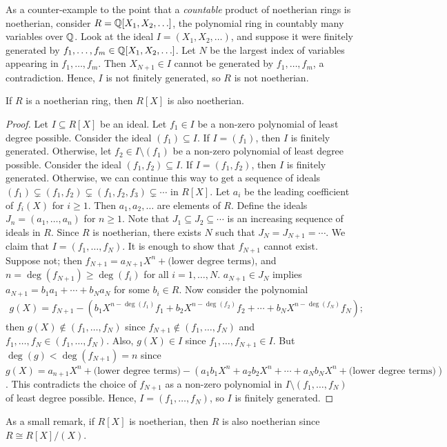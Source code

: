 \begin{example}
    As a counter-example to the point that a \textit{countable} product of noetherian rings is noetherian, consider $R = \mathbb{Q}[X_{1},X_{2},\ldots]$, the polynomial ring in countably many variables over $\mathbb{Q}$. Look at the ideal $I = (X_{1},X_{2},\ldots)$, and suppose it were finitely generated by $f_{1},\ldots,f_{m} \in \mathbb{Q}[X_{1},X_{2},\ldots]$. Let $N$ be the largest index of variables appearing in $f_{1},\ldots,f_{m}$. Then $X_{N+1} \in I$ cannot be generated by $f_{1},\ldots,f_{m}$, a contradiction. Hence, $I$ is not finitely generated, so $R$ is not noetherian.
\end{example}

\begin{theorem}
    If $R$ is a noetherian ring, then $R[X]$ is also noetherian.
\end{theorem}
\begin{proof}
    Let $I \subseteq R[X]$ be an ideal. Let $f_{1} \in I$ be a non-zero polynomial of least degree possible. Consider the ideal $(f_{1}) \subseteq I$. If $I = (f_{1})$, then $I$ is finitely generated. Otherwise, let $f_{2} \in I \setminus (f_{1})$ be a non-zero polynomial of least degree possible. Consider the ideal $(f_{1},f_{2}) \subseteq I$. If $I = (f_{1},f_{2})$, then $I$ is finitely generated. Otherwise, we can continue this way to get a sequence of ideals $(f_{1}) \subsetneq (f_{1},f_{2}) \subsetneq (f_{1},f_{2},f_{3}) \subsetneq \cdots$ in $R[X]$. Let $a_{i}$ be the leading coefficient of $f_{i}(X)$ for $i \geq 1$. Then $a_{1},a_{2},\ldots$ are elements of $R$. Define the ideals $J_{n} = (a_{1},\ldots,a_{n})$ for $n \geq 1$. Note that $J_{1} \subseteq J_{2} \subseteq \cdots$ is an increasing sequence of ideals in $R$. Since $R$ is noetherian, there exists $N$ such that $J_{N} = J_{N+1} = \cdots$. We claim that $I = (f_{1},\ldots,f_{N})$. It is enough to show that $f_{N+1}$ cannot exist. Suppose not; then $f_{N+1} = a_{N+1} X^{n} + \text{(lower degree terms)}$, and $n = \deg(f_{N+1}) \geq \deg(f_{i})$ for all $i = 1,\ldots,N$. $a_{N+1} \in J_{N}$ implies $a_{N+1} = b_{1}a_{1} + \cdots + b_{N} a_{N}$ for some $b_{i} \in R$. Now consider the polynomial
    \begin{align}
        g(X) = f_{N+1} - \left( b_{1} X^{n-\deg(f_{1})}f_{1} + b_{2} X^{n-\deg(f_{2})}f_{2} + \cdots + b_{N} X^{n-\deg(f_{N})}f_{N} \right);
    \end{align}
    then $g(X) \notin (f_{1},\ldots,f_{N})$ since $f_{N+1} \notin (f_{1},\ldots,f_{N})$ and $f_{1},\ldots,f_{N} \in (f_{1},\ldots,f_{N})$. Also, $g(X) \in I$ since $f_{1},\ldots,f_{N+1} \in I$. But $\deg(g) < \deg(f_{N+1}) = n$ since $g(X) = a_{n+1} X^{n} + \text{(lower degree terms)} - \left( a_{1}b_{1}X^{n} + a_{2}b_{2}X^{n} + \cdots + a_{N}b_{N}X^{n} + \text{(lower degree terms)} \right)$. This contradicts the choice of $f_{N+1}$ as a non-zero polynomial in $I \setminus (f_{1},\ldots,f_{N})$ of least degree possible. Hence, $I = (f_{1},\ldots,f_{N})$, so $I$ is finitely generated.
\end{proof}

As a small remark, if $R[X]$ is noetherian, then $R$ is also noetherian since $R \cong R[X]/(X)$.